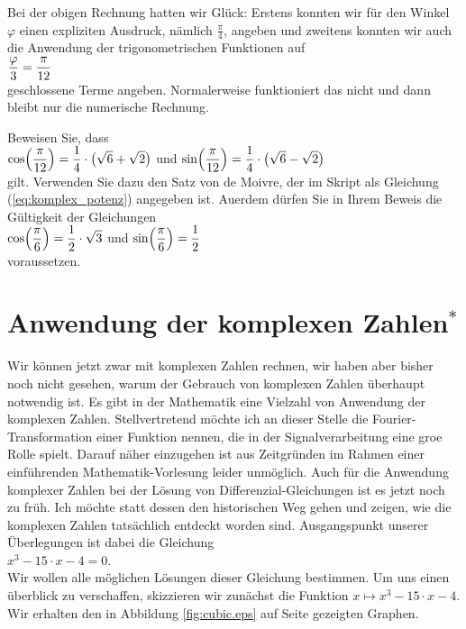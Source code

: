 \remark
Bei der obigen Rechnung hatten wir Gl\"{u}ck:  Erstens konnten wir f\"{u}r den Winkel $\varphi$ einen expliziten
Ausdruck, n\"{a}mlich $\frac{\pi}{4}$, angeben und zweitens konnten wir auch die Anwendung der trigonometrischen
Funktionen auf
\\[0.2cm]
\hspace*{1.3cm}
$\displaystyle\frac{\varphi}{3} = \frac{\pi}{12}$ 
\\[0.2cm]
geschlossene Terme angeben.  Normalerweise
funktioniert das nicht und dann bleibt nur die numerische Rechnung. 

\exercise
Beweisen Sie, dass 
\\[0.2cm]
\hspace*{1.3cm}
$\displaystyle\cos\Bigl(\frac{\pi}{12}\Bigr) = \frac{1}{4} \cdot \bigl(\sqrt{6} + \sqrt{2}\bigr)$ \quad und \quad
$\displaystyle\sin\Bigl(\frac{\pi}{12}\Bigr) = \frac{1}{4} \cdot \bigl(\sqrt{6} - \sqrt{2}\bigr)$
\\[0.2cm]
gilt.  Verwenden Sie dazu den Satz von de Moivre, der im Skript als Gleichung
(\ref{eq:komplex_potenz}) angegeben ist. 
Au\3erdem d\"{u}rfen Sie in Ihrem Beweis die G\"{u}ltigkeit der Gleichungen
\\[0.2cm]
\hspace*{1.3cm}
$\displaystyle\cos\Bigl(\frac{\pi}{6}\Bigr) = \frac{1}{2}\cdot\sqrt{3}$ \quad und \quad $\displaystyle\sin\Bigl(\frac{\pi}{6}\Bigr) = \frac{1}{2}$
\\[0.2cm]
voraussetzen.
\exend

\section{Anwendung der komplexen Zahlen$^*$}
Wir k\"{o}nnen jetzt zwar mit komplexen Zahlen rechnen, wir haben aber bisher noch nicht gesehen, warum der 
Gebrauch von komplexen Zahlen \"{u}berhaupt notwendig ist.  Es gibt in der Mathematik eine Vielzahl von
Anwendung der komplexen Zahlen.  Stellvertretend m\"{o}chte ich an dieser Stelle die Fourier-Transformation
einer Funktion nennen, die in der Signalverarbeitung eine gro\3e Rolle spielt.  Darauf n\"{a}her einzugehen
ist aus Zeitgr\"{u}nden im Rahmen einer einf\"{u}hrenden Mathematik-Vorlesung leider unm\"{o}glich.  Auch f\"{u}r die
Anwendung komplexer Zahlen bei der L\"{o}sung von Differenzial-Gleichungen ist es jetzt noch zu fr\"{u}h.  Ich
m\"{o}chte statt dessen den historischen Weg gehen und zeigen, wie die komplexen Zahlen tats\"{a}chlich entdeckt
worden sind.  Ausgangspunkt unserer \"{U}berlegungen ist dabei die Gleichung
\\[0.2cm]
\hspace*{1.3cm}
$x^3 - 15 \cdot x - 4 = 0$.
\\[0.2cm]
Wir wollen alle m\"{o}glichen L\"{o}sungen dieser Gleichung bestimmen.  Um uns einen \"{u}berblick zu verschaffen,
skizzieren wir zun\"{a}chst die Funktion $x \mapsto x^3 - 15 \cdot x - 4$.  Wir erhalten den in Abbildung
\ref{fig:cubic.eps} auf Seite \pageref{fig:cubic.eps} gezeigten Graphen.

